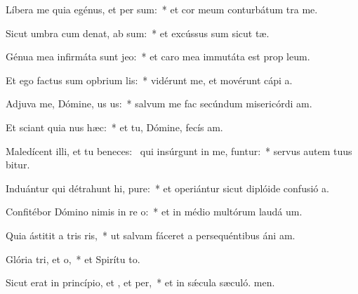 \item Líbera me quia egénus, et per  sum:~* et cor meum conturbátum  tra me.
\item Sicut umbra cum denat, ab sum:~* et excússus sum sicut tæ.
\item Génua mea infirmáta sunt  jeo:~* et caro mea immutáta est prop leum.
\item Et ego factus sum opbrium lis:~* vidérunt me, et movérunt cápi a.
\item Adjuva me, Dómine, us us:~* salvum me fac secúndum misericórdi am.
\item Et sciant quia nus  hæc:~* et tu, Dómine, fecís am.
\item Maledícent illi, et tu beneces:~\pscross{} qui insúrgunt in me, funtur:~* servus autem tuus bitur.
\item Induántur qui détrahunt hi, pure:~* et operiántur sicut diplóide confusió a.
\item Confitébor Dómino nimis in re o:~* et in médio multórum laudá um.
\item Quia ástitit a tris ris,~* ut salvam fáceret a persequéntibus áni am.
\item Glória tri, et o,~* et Spirítu to.
\item Sicut erat in princípio, et , et per,~* et in sǽcula sæculó. men.
